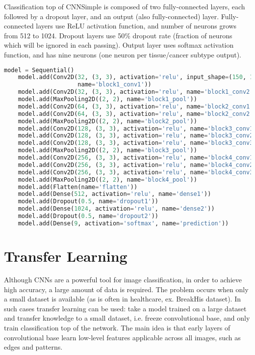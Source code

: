 Classification top of CNNSimple is composed of two fully-connected layers, each followed by a dropout layer, and an output (also fully-connected) layer. Fully-connected layers use ReLU activation function, and number of neurons grows from 512 to 1024. Dropout layers use 50\% dropout rate (fraction of neurons which will be ignored in each passing). Output layer uses softmax activation function, and has nine neurons (one neuron per tissue/cancer subtype output). 
\vspace{1mm}
\begin{lstlisting}[language={Python}, basicstyle=\scriptsize]
	model = Sequential()
	model.add(Conv2D(32, (3, 3), activation='relu', input_shape=(150, 150, 3),     
	                 name='block1_conv1'))
	model.add(Conv2D(32, (3, 3), activation='relu', name='block1_conv2'))
	model.add(MaxPooling2D((2, 2), name='block1_pool'))
	model.add(Conv2D(64, (3, 3), activation='relu', name='block2_conv1'))
	model.add(Conv2D(64, (3, 3), activation='relu', name='block2_conv2'))
	model.add(MaxPooling2D((2, 2), name='block2_pool'))
	model.add(Conv2D(128, (3, 3), activation='relu', name='block3_conv1'))
	model.add(Conv2D(128, (3, 3), activation='relu', name='block3_conv2'))
	model.add(Conv2D(128, (3, 3), activation='relu', name='block3_conv3'))
	model.add(MaxPooling2D((2, 2), name='block3_pool'))
	model.add(Conv2D(256, (3, 3), activation='relu', name='block4_conv1'))
	model.add(Conv2D(256, (3, 3), activation='relu', name='block4_conv2'))
	model.add(Conv2D(256, (3, 3), activation='relu', name='block4_conv3'))
	model.add(MaxPooling2D((2, 2), name='block4_pool'))
	model.add(Flatten(name='flatten'))
	model.add(Dense(512, activation='relu', name='dense1'))
	model.add(Dropout(0.5, name='dropout1'))
	model.add(Dense(1024, activation='relu', name='dense2'))
	model.add(Dropout(0.5, name='dropout2'))
	model.add(Dense(9, activation='softmax', name='prediction'))
\end{lstlisting} 

\section{Transfer Learning}
\label{vgg19}

Although CNNs are a powerful tool for image classification, in order to achieve high accuracy, a large amount of data is required. The problem occurs when only a small dataset is available (as is often in healthcare, ex. BreakHis dataset). In such cases transfer learning can be used: take a model trained on a large dataset and transfer knowledge to a small dataset, i.e. freeze convolutional base, and only train classification top of the network. The main idea is that early layers of convolutional base learn low-level features applicable across all images, such as edges and patterns.

